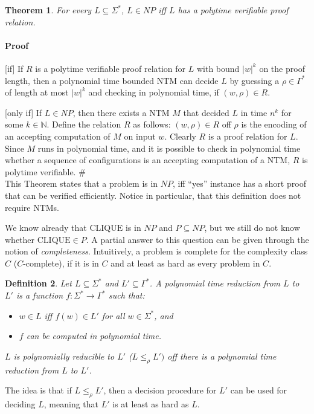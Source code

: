 \documentclass{report}
\newtheorem{definition}{Definition}[chapter]
\newtheorem{theorem}[definition]{Theorem}
\begin{document}
\begin{theorem}For every $L\subseteq\Sigma^*$, $L\in NP$ iff $L$ has a polytime verifiable proof relation.
\end{theorem}

\paragraph{Proof}[if] If $R$ is a polytime verifiable proof relation for $L$ with bound $|w|^k$ on the proof length,  then a polynomial time bounded NTM can decide $L$ by guessing a $\rho\in\Gamma^*$ of length at most $|w|^k$ and checking in polynomial time, if $(w,\rho)\in R$.

[only if] If $L\in NP$, then there exists a NTM $M$ that decided $L$ in time $n^k$ for some $k\in\mathbb{N}$. Define the relation $R$ as follows: $(w,\rho)\in R$ off $\rho$ is the encoding of an accepting computation of $M$ on input $w$. Clearly $R$ is a proof relation for $L$. Since $M$ runs in polynomial time, and it is possible to check in polynomial time whether a sequence of configurations is an accepting computation of a NTM, $R$ is polytime verifiable. $\#$\\

This Theorem states that a problem is in $NP$, iff ``yes'' instance has a short proof that can be verified efficiently. Notice in particular, that this definition does not require NTMs.

We know already that $\mathrm{CLIQUE}$ is in $NP$ and $P\subseteq NP$, but we still do not know whether $\mathrm{CLIQUE} \in P$. A partial answer to this question can be given through the notion of \textit{completeness}. Intuitively, a problem is complete for the complexity class $C$ ($C$-complete), if it is in $C$ and at least as hard as every problem in $C$.

\begin{definition}Let $L\subseteq\Sigma^*$ and $L'\subseteq\Gamma^*$. A polynomial time reduction from $L$ to $L'$ is a function $f:\Sigma^*\rightarrow\Gamma^*$ such that: 
\begin{itemize}
\item[-] $w\in  L$ iff $f(w)\in L'$ for all $w\in \Sigma^*$, and
\item[-] $f$ can be computed in polynomial time.
\end{itemize}
$L$ is polynomially reducible to $L'$ ($L\leq_\rho L')$ off there is a polynomial time reduction from $L$ to $L'$.
\end{definition}
The idea is that if $L\leq_\rho L'$, then a decision procedure for $L'$ can be used for deciding $L$, meaning that $L'$ is at least as hard as $L$.
\end{document}
